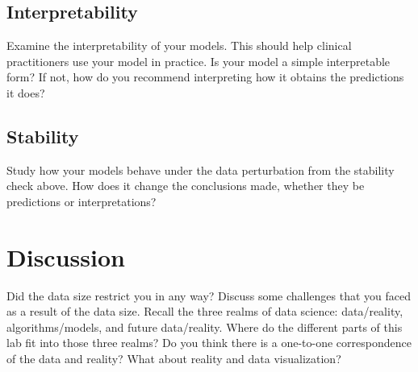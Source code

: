 \documentclass[10pt,letterpaper]{article}
\begin{document}
\subsection*{Interpretability}

Examine the interpretability of your models. This should help clinical practitioners use your model in practice. Is your model a simple interpretable form? If not, how do you recommend interpreting how it obtains the predictions it does?

\subsection*{Stability}

Study how your models behave under the data perturbation from the stability check above. How does it change the conclusions made, whether they be predictions or interpretations?

\section*{Discussion}

Did the data size restrict you in any way? Discuss some challenges that you faced as a result of the data size. Recall the three realms of data science: data/reality, algorithms/models, and future data/reality. Where do the different parts of this lab fit into those three realms? Do you think there is a one-to-one correspondence of the data and reality? What about reality and data visualization?
\end{document}
